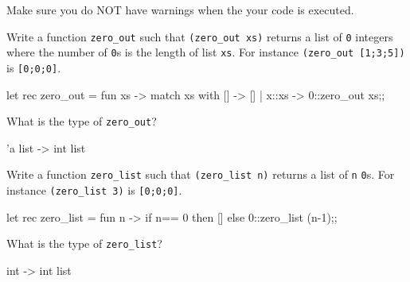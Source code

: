

\renewcommand\AUTHOR{nweadick1@cougars.ccis.edu} %


\topmattertwo

Make sure you do NOT have warnings when the your code is executed.

\nextq
Write a function \verb!zero_out! such that
\verb!(zero_out xs)! returns a list of
\verb!0! integers where the number of \verb!0!s
is the length of list \verb!xs!.
For instance \verb!(zero_out [1;3;5])! is \verb![0;0;0]!.
\\
\ANSWER
\begin{answercode}
let rec zero_out = fun xs -> match xs with [] -> [] | x::xs -> 0::zero_out xs;;
\end{answercode}

\nextq
What is the type of \verb!zero_out!?
\\
\ANSWER
\begin{answercode}
'a list -> int list
\end{answercode}

\nextq
Write a function \verb!zero_list! such that
\verb!(zero_list n)! returns a list of \verb!n! \verb!0!s.
For instance \verb!(zero_list 3)! is \verb![0;0;0]!.
\\
\ANSWER
\begin{answercode}
let rec zero_list = fun n -> if n== 0 then [] else 0::zero_list (n-1);;
\end{answercode}

\nextq
What is the type of \verb!zero_list!?
\\
\ANSWER
\begin{answercode}
int -> int list
\end{answercode}

\newpage


